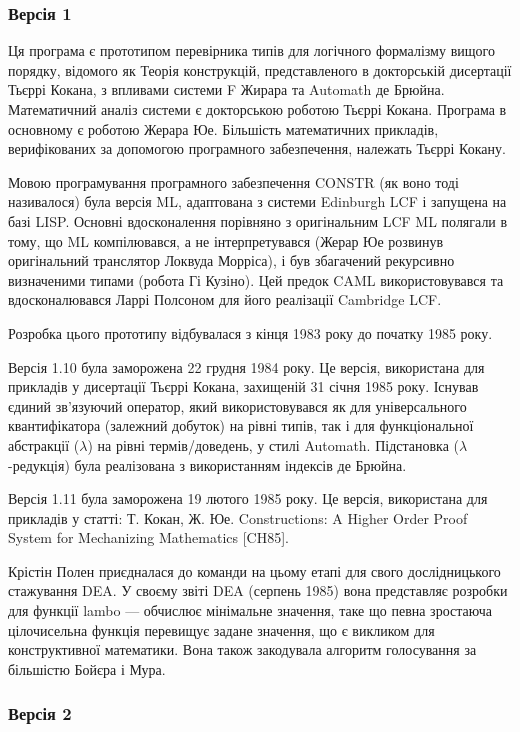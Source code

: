 \documentclass{article}
\begin{document}
\subsubsection{Версія 1}

Ця програма є прототипом перевірника типів для логічного формалізму вищого порядку, відомого як Теорія конструкцій, представленого в докторській дисертації Тьєррі Кокана, з впливами системи F Жирара та Automath де Брюйна. Математичний аналіз системи є докторською роботою Тьєррі Кокана. Програма в основному є роботою Жерара Юе. Більшість математичних прикладів, верифікованих за допомогою програмного забезпечення, належать Тьєррі Кокану.

Мовою програмування програмного забезпечення CONSTR (як воно тоді називалося) була версія ML, адаптована з системи Edinburgh LCF і запущена на базі LISP. Основні вдосконалення порівняно з оригінальним LCF ML полягали в тому, що ML компілювався, а не інтерпретувався (Жерар Юе розвинув оригінальний транслятор Локвуда Морріса), і був збагачений рекурсивно визначеними типами (робота Гі Кузіно). Цей предок CAML використовувався та вдосконалювався Ларрі Полсоном для його реалізації Cambridge LCF.

Розробка цього прототипу відбувалася з кінця 1983 року до початку 1985 року.

Версія 1.10 була заморожена 22 грудня 1984 року. Це версія, використана для прикладів у дисертації Тьєррі Кокана, захищеній 31 січня 1985 року. Існував єдиний зв’язуючий оператор, який використовувався як для універсального квантифікатора (залежний добуток) на рівні типів, так і для функціональної абстракції ($\lambda$) на рівні термів/доведень, у стилі Automath. Підстановка ($\lambda$-редукція) була реалізована з використанням індексів де Брюйна.

Версія 1.11 була заморожена 19 лютого 1985 року. Це версія, використана для прикладів у статті: Т. Кокан, Ж. Юе. Constructions: A Higher Order Proof System for Mechanizing Mathematics [CH85].

Крістін Полен приєдналася до команди на цьому етапі для свого дослідницького стажування DEA. У своєму звіті DEA (серпень 1985) вона представляє розробки для функції lambo — обчислює мінімальне значення, таке що певна зростаюча цілочисельна функція перевищує задане значення, що є викликом для конструктивної математики. Вона також закодувала алгоритм голосування за більшістю Бойєра і Мура.

\subsubsection{Версія 2}
\end{document}
